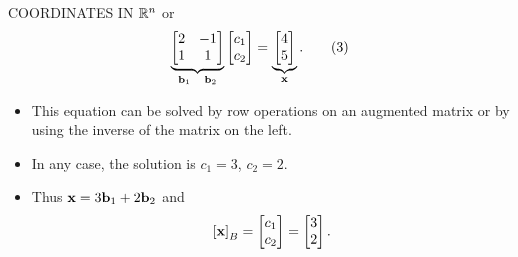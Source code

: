 \begin{frame}[shrink=8]{COORDINATES IN $\mathbb{R}^n$}
or
\begin{equation}
\underbrace{\begin{bmatrix}2&-1\\1&1\end{bmatrix}}_{\mathbf{b}_1\quad\mathbf{b}_2}
\begin{bmatrix}c_1\\c_2\end{bmatrix}
=\underbrace{\begin{bmatrix}4\\5\end{bmatrix}}_{\mathbf{x}}. \tag{3}
\end{equation}
\begin{itemize}
\item This equation can be solved by row operations on an augmented matrix or by using the inverse of the matrix on the left.
\item In any case, the solution is $c_1=3$, $c_2=2$.
\item Thus $\mathbf{x}=3\mathbf{b}_1+2\mathbf{b}_2$ and
\[
\left[\mathbf{x}\right]_{B}=\begin{bmatrix}c_1\\c_2\end{bmatrix}
=\begin{bmatrix}3\\2\end{bmatrix}.
\]
\end{itemize}
\end{frame}

